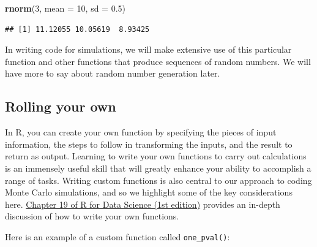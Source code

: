 \documentclass[
]{book}
\newenvironment{Shaded}{\begin{snugshade}}{\end{snugshade}}
\newcommand{\AttributeTok}[1]{\textcolor[rgb]{0.13,0.29,0.53}{#1}}
\newcommand{\ControlFlowTok}[1]{\textcolor[rgb]{0.13,0.29,0.53}{\textbf{#1}}}
\newcommand{\DecValTok}[1]{\textcolor[rgb]{0.00,0.00,0.81}{#1}}
\newcommand{\FloatTok}[1]{\textcolor[rgb]{0.00,0.00,0.81}{#1}}
\newcommand{\FunctionTok}[1]{\textcolor[rgb]{0.13,0.29,0.53}{\textbf{#1}}}
\newcommand{\NormalTok}[1]{#1}
\newcommand{\OtherTok}[1]{\textcolor[rgb]{0.56,0.35,0.01}{#1}}
\newcommand{\SpecialCharTok}[1]{\textcolor[rgb]{0.81,0.36,0.00}{\textbf{#1}}}
\begin{document}
\begin{Shaded}
\begin{Highlighting}[]
\FunctionTok{rnorm}\NormalTok{(}\DecValTok{3}\NormalTok{, }\AttributeTok{mean =} \DecValTok{10}\NormalTok{, }\AttributeTok{sd =} \FloatTok{0.5}\NormalTok{)}
\end{Highlighting}
\end{Shaded}

\begin{verbatim}
## [1] 11.12055 10.05619  8.93425
\end{verbatim}

In writing code for simulations, we will make extensive use of this particular function and other functions that produce sequences of random numbers.
We will have more to say about random number generation later.

\subsection{Rolling your own}\label{rolling-your-own}

In R, you can create your own function by specifying the pieces of input information, the steps to follow in transforming the inputs, and the result to return as output.
Learning to write your own functions to carry out calculations is an immensely useful skill that will greatly enhance your ability to accomplish a range of tasks.
Writing custom functions is also central to our approach to coding Monte Carlo simulations, and so we highlight some of the key considerations here.
\href{https://r4ds.had.co.nz/functions.html}{Chapter 19 of R for Data Science (1st edition)} provides an in-depth discussion of how to write your own functions.

Here is an example of a custom function called \texttt{one\_pval()}:

\begin{Shaded}
\end{Shaded}
\end{document}
